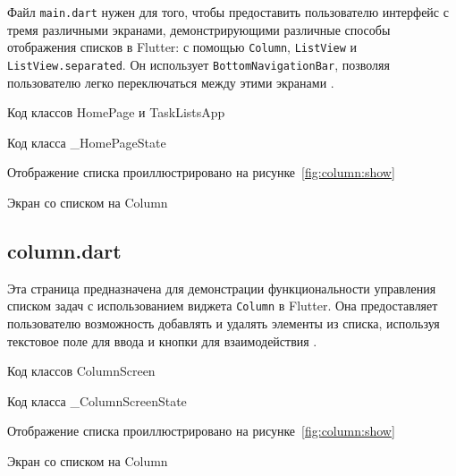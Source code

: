 Файл \texttt{main.dart} нужен для того,
чтобы предоставить пользователю интерфейс с тремя различными экранами,
демонстрирующими различные способы отображения списков в Flutter:
с помощью \texttt{Column}, \texttt{ListView} и \texttt{ListView.separated}.
Он использует \texttt{BottomNavigationBar},
позволяя пользователю легко переключаться между этими экранами
.

\begin{image}
	\caption{Код классов HomePage и TaskListsApp}
	\label{fig:lst:1}
\end{image}

\begin{image}
	\caption{Код класса \_HomePageState}
	\label{fig:lst:2}
\end{image}

Отображение списка проиллюстрировано на рисунке~\ref{fig:column:show}

\begin{image}
	\caption{Экран со списком на Column}
	\label{fig:column:show}
\end{image}

\subsection{column.dart}

Эта страница предназначена для демонстрации функциональности управления
списком задач с использованием виджета \texttt{Column} в Flutter.
Она предоставляет пользователю возможность добавлять
и удалять элементы из списка, используя текстовое поле для ввода
и кнопки для взаимодействия .

\begin{image}
	\caption{Код классов ColumnScreen}
	\label{fig:lst:column}
\end{image}

\begin{image}
	\caption{Код класса \_ColumnScreenState}
	\label{fig:lst:column:state}
\end{image}

Отображение списка проиллюстрировано на рисунке~\ref{fig:column:show}

\begin{image}
	\caption{Экран со списком на Column}
	\label{fig:column:show}
\end{image}

